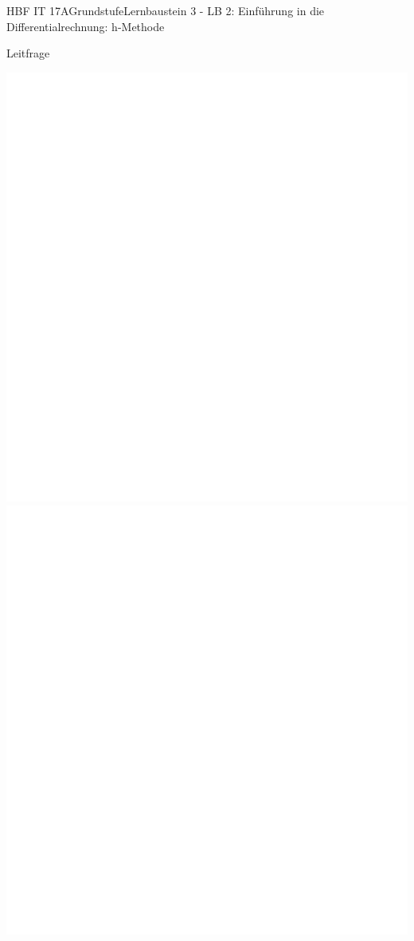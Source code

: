 \documentclass[oneside,openany,headings=optiontotoc,11pt,numbers=noenddot]{scrreprt}
\begin{document}
\begin{worksheet}{HBF IT 17A}{Grundstufe}{Lernbaustein 3 - LB 2: Einführung in die Differentialrechnung: h-Methode}
		\begin{framed}
			\noindent
			\tiny{\color{codegray}Leitfrage}\\
		\end{framed}
		
		\begin{framed}
			\includegraphics[scale=0.92]{../empty.jpg}
			\includegraphics[scale=1.1]{../empty.jpg}
		\end{framed}
	

\end{worksheet}
\end{document}

